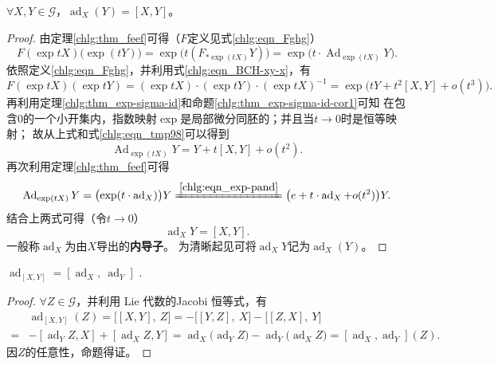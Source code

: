 \begin{theorem}\label{chlg:thm_adxy1}
    $\forall X,Y \in \mathscr{G}$，$\operatorname{ad}_{X}(Y)=[X,Y]$。
\end{theorem}
\begin{proof}
    由定理\ref{chlg:thm_feef}可得（$F$定义见式\eqref{chlg:eqn_Fghg}）
    \begin{equation}\label{chlg:eqn_tmp98}
        F(\exp tX)\bigl(\exp (t Y)\bigr) = \exp \bigl(t (F_{*\exp (tX)} Y)\bigr)
        =\exp \bigl(t \cdot \operatorname{Ad}_{\exp (tX)} Y\bigr) .
    \end{equation}
    依照定义\eqref{chlg:eqn_Fghg}，并利用式\eqref{chlg:eqn_BCH-xy-x}，有
    \begin{equation*}
        F(\exp tX) (\exp tY) = (\exp tX)\cdot  (\exp tY) \cdot (\exp tX)^{-1}
        =\exp\bigl(tY+t^2[X,Y]+o(t^3)\bigr) .
    \end{equation*}
    再利用定理\ref{chlg:thm_exp-sigma-id}和命题\ref{chlg:thm_exp-sigma-id-cor1}可知
    在包含0的一个小开集内，指数映射$\exp$是局部微分同胚的；并且当$t\to 0$时是恒等映射；
    故从上式和式\eqref{chlg:eqn_tmp98}可以得到
    \begin{equation}
        \operatorname{Ad}_{\exp (tX)} Y = Y+t[X,Y]+o(t^2).
    \end{equation}
    再次利用定理\ref{chlg:thm_feef}可得
    \begin{equation}
        \operatorname{Ad}_{\exp (tX)} Y = \bigl(\exp (t\cdot \operatorname{ad}_X)\bigr) Y
        \xlongequal{\ref{chlg:eqn_exp-pand}}
        \bigl(e + t \cdot \operatorname{ad}_X + o(t^2)\bigr) Y .
    \end{equation}
    结合上两式可得（令$t\to 0$）
    \begin{equation}
        \operatorname{ad}_X  Y = [X,Y].
    \end{equation}
    一般称$\operatorname{ad}_X $为由$X$导出的\textbf{内导子}。
    为清晰起见可将$\operatorname{ad}_X  Y$记为$\operatorname{ad}_X  (Y)$。
\end{proof}

\begin{theorem}
    $\operatorname{ad}_{[X,Y]} = \left[\operatorname{ad}_X,\  \operatorname{ad}_Y \right]$ .
\end{theorem}
\begin{proof}
    $\forall Z \in \mathscr{G}$，并利用 Lie 代数的Jacobi 恒等式，有
    \begin{align*}
        &\operatorname{ad}_{[X,Y]}(Z) = \bigl[[X,Y],\ Z\bigr]
        = - \bigl[[Y,Z],\ X\bigr] - \bigl[[Z,X],\ Y\bigr] \\
        =& - \left[\operatorname{ad}_Y Z, X\right] + \left[\operatorname{ad}_X Z, Y\right]
        = \operatorname{ad}_X\bigl( \operatorname{ad}_Y Z \bigr) - \operatorname{ad}_Y\bigl( \operatorname{ad}_X Z\bigr)
        = \left[\operatorname{ad}_X,\operatorname{ad}_Y \right](Z) .
    \end{align*}
    因$Z$的任意性，命题得证。
\end{proof}

